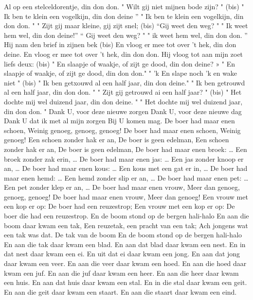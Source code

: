 \documentclass{article}
\begin{document}
\begin{songs}{}
Al op een stelceldorentje, din don don.
\endverse
\beginverse*
" Wilt gij niet mijnen bode zijn? " (bis)
" Ik ben te klein een vogelkijn, din don deine ” 
" Ik ben te klein een vogelkijn, din don don. "
\endverse
\beginverse*
" Zijt gij maar kleine, gij zijt snel; (bis)
“Gij weet den weg? " " Ik weet hem wel, din don deine!”
“ Gij weet den weg? " " ik weet hem wel, din don don. ”
\endverse
\beginverse*
Hij nam den brief in zijnen bek (bis)
En vloog er mee tot over 't hek, din don deine.
En vloog er mee tot over 't hek, din don don.
\endverse
\beginverse*
Hij vloog tot aan mijn zoet liefs deux: (bis)
" En slaapje of waakje, of zijt ge dood, din don deine? »
" En slaapje of waakje, of zijt ge dood, din don don."
\endverse
\beginverse*
" 'k En slape noch 'k en wake niet " (bis)
" Ik ben getxouwd al een half jaar, din don deine."
" Ik ben getrouwd al een half jaar, din don don. "
\endverse
\beginverse*
" Zijt gij getrouwd ai een half jaar? " (bis)
" Het dochte mij wel duizend jaar, din don deine. "
" Het dochte mij wel duizend jaar, din don don. "
\endverse
\endsong
{}
\beginverse*
Dank U, voor deze nieuwe zorgen
Dank U, voor deze nieuwe dag
Dank U dat ik met al mijn zorgen
Bij U komen mag. 
\endverse
\endsong
{}
\beginverse
De boer had maar enen schoen,
Weinig genoeg, genoeg, genoeg!
De boer had maar enen schoen,
Weinig genoeg! 
Een schoen zonder hak er an,
De boer is geen edelman,
Een schoen zonder hak er an,
De boer is geen edelman,
\endverse
\beginverse
De boer had maar enen broek: …
Een broek zonder zak erin, …
\endverse
\beginverse
De boer had maar enen jas: …
Een jas zonder knoop er an, …
\endverse
\beginverse
De boer had maar enen kous: …
Een kous met een gat er in, …
\endverse
\beginverse
De boer had maar enen hemd: …
Een hemd zonder slip er an, …
\endverse
\beginverse
De boer had maar enen pet: …
Een pet zonder klep er an, …
\endverse
\beginverse
De boer had maar enen vrouw,
Meer dan genoeg, genoeg, genoeg! 
De boer had maar enen vrouw,
Meer dan genoeg!
Een vrouw met een kop er op: 
De boer had een reuzestrop;
Een vrouw met een kop er op:
De boer die had een reuzestrop. 
\endverse
\endsong
{}
\beginchorus
En de boom stond op de bergen hali-halo 
En aan die boom daar kwam een tak,
Een reuzetak, een pracht van een tak;
Ach jongens wat een tak was dat.
De tak van de boom
En de boom stond op de bergen hali-halo 
\endchorus
\beginverse
En aan die tak daar kwam een blad.
\endverse
\beginverse
En aan dat blad daar kwam een nest. 
\endverse
\beginverse
En in dat nest daar kwam een ei.
\endverse
\beginverse
En uit dat ei daar kwam een jong. 
\endverse
\beginverse
En aan dat jong daar kwam een veer. 
\endverse
\beginverse
En aan die veer daar kwam een hoed. 
\endverse
\beginverse
En aan die hoed daar kwam een juf. 
\endverse
\beginverse
En aan die juf daar kwam een heer. 
\endverse
\beginverse
En aan die heer daar kwam een huis.
\endverse
\beginverse
En aan dat huis daar kwam een stal.
\endverse
\beginverse
En in die stal daar kwam een geit.
\endverse
\beginverse
En aan die geit daar kwam een staart. 
\endverse
\beginverse
En aan die staart daar kwam een eind. 
\endverse
\endsong

\end{songs}

\end{document}
